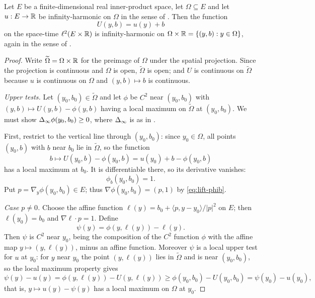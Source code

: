\begin{lemma}
Let $E$ be a finite-dimensional real inner-product space, let $\Omega\subseteq E$
and let $u:E\to\mathbb{R}$ be infinity-harmonic on $\Omega$ in the sense of
. Then the function
\[
  U(y,b)=u(y)+b
\]
on the space-time $\ell^2(E\times\mathbb{R})$ is infinity-harmonic on
$\Omega\times\mathbb{R}=\{(y,b):y\in\Omega\}$, again in the sense of
.
\end{lemma}
\begin{proof}
Write $\widetilde\Omega=\Omega\times\mathbb{R}$ for the preimage of $\Omega$ under the
spatial projection. Since the projection is continuous and $\Omega$ is open,
$\widetilde\Omega$ is open; and $U$ is continuous on $\widetilde\Omega$ because
$u$ is continuous on $\Omega$ and $(y,b)\mapsto b$ is continuous.

\emph{Upper tests.} Let $(y_0,b_0)\in\widetilde\Omega$ and let $\phi$ be $C^2$
near $(y_0,b_0)$ with $(y,b)\mapsto U(y,b)-\phi(y,b)$ having a local maximum on
$\widetilde\Omega$ at $(y_0,b_0)$. We must show $\Delta_{\infty}\phi(y_0,b_0)\ge0$, where
$\Delta_{\infty}$ is as in .

First, restrict to the vertical line through $(y_0,b_0)$: since $y_0\in\Omega$,
all points $(y_0,b)$ with $b$ near $b_0$ lie in $\widetilde\Omega$, so the
function
\[
  b\longmapsto U(y_0,b)-\phi(y_0,b)=u(y_0)+b-\phi(y_0,b)
\]
has a local maximum at $b_0$. It is differentiable there, so its derivative
vanishes:
\begin{equation}\label{eq:lift-phib}
  \phi_b(y_0,b_0)=1 .
\end{equation}
Put $p=\nabla_y\phi(y_0,b_0)\in E$; thus $\nabla\phi(y_0,b_0)=(p,1)$ by
\eqref{eq:lift-phib}.

\emph{Case $p\ne0$.} Choose the affine function
$\ell(y)=b_0+\langle p,y-y_0\rangle/|p|^2$ on $E$; then $\ell(y_0)=b_0$ and
$\nabla\ell\cdot p=1$. Define
\[
  \psi(y)=\phi(y,\ell(y))-\ell(y).
\]
Then $\psi$ is $C^2$ near $y_0$, being the composition of the $C^2$ function
$\phi$ with the affine map $y\mapsto(y,\ell(y))$, minus an affine function.
Moreover $\psi$ is a local upper test for $u$ at $y_0$: for $y$ near $y_0$ the
point $(y,\ell(y))$ lies in $\widetilde\Omega$ and is near $(y_0,b_0)$, so the
local maximum property gives
\[
  \psi(y)-u(y)=\phi(y,\ell(y))-U(y,\ell(y))
    \ge\phi(y_0,b_0)-U(y_0,b_0)=\psi(y_0)-u(y_0),
\]
that is, $y\mapsto u(y)-\psi(y)$ has a local maximum on $\Omega$ at $y_0$.


\end{proof}
